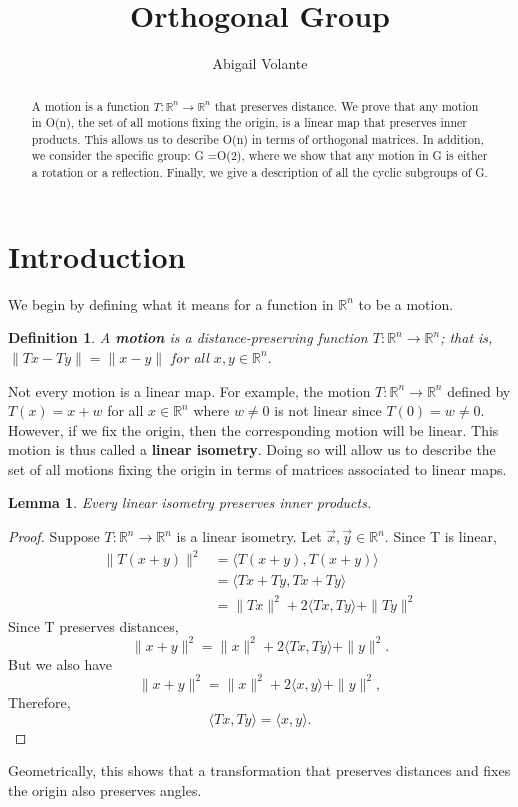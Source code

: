 \documentclass[a4 paper, 12pt]{article}
\newtheorem{lemma}[theorem]{Lemma}
\newtheorem{definition}[theorem]{Definition}
\begin{document}
	\author{Abigail Volante}
	\title{Orthogonal Group}
	\maketitle
	
	\begin{abstract}
		A motion is a function $T: \mathbb{R}^n \rightarrow \mathbb{R}^n$ that preserves distance. We prove that any motion in O(n), the set of all motions fixing the origin, is a linear map that preserves inner products. This allows us to describe O(n) in terms of orthogonal matrices.  In addition, we consider the specific group: G =O(2), where we show that any motion in G is either a rotation or a reflection. Finally, we give a description of all the cyclic subgroups of G. 
	\end{abstract}
	
	\section{Introduction}
	We begin by defining what it means for a function in $\mathbb{R}^n$ to be a motion. 
	
	\begin{definition}
		A \textbf{motion} is a distance-preserving function $T: \mathbb{R}^n \rightarrow \mathbb{R}^n$; that is, $\| Tx -Ty\| = \|x-y\|$ for all $x,y\in \mathbb{R}^n.$
	\end{definition}
	
	Not every motion is a linear map. For example, the motion $T: \mathbb{R}^n \rightarrow \mathbb{R}^n$ defined by $T(x) = x + w$ for all $x\in \mathbb{R}^n$ where $w \not = 0$ is not linear since $T(0) = w \not = 0.$ \cite{rotman} However, if we fix the origin, then the corresponding motion will be linear. This motion is thus called a \textbf{linear isometry}. Doing so will allow us to describe the set of all motions fixing the origin in terms of matrices associated to linear maps. \cite{baker}


		\begin{lemma}
		Every linear isometry preserves inner products. 
	\end{lemma}
	\begin{proof}
		Suppose $T: \mathbb{R}^n \rightarrow \mathbb{R}^n$ is a linear isometry. Let $\vec{x}, \vec{y} \in \mathbb{R}^n.$ Since T is linear,
		\begin{align*}
			\|T(x+ y)\|^2 
			&= \langle T(x+y), T(x+y) \rangle\\
			& = \langle Tx +Ty, Tx + Ty \rangle \\
			&= \| Tx \|^2 + 2\langle Tx, Ty \rangle + \|Ty\|^2
		\end{align*}
		Since T preserves distances,
		$$\|x+y\|^2 = \|x\|^2 + 2\langle Tx, Ty \rangle + \|y\|^2.$$
		But we also have
		$$\|x+y\|^2 = \|x\|^2 + 2 \langle x, y \rangle + \|y\|^2,$$
		Therefore,
		$$\langle Tx, Ty \rangle = \langle x, y \rangle.$$
	\end{proof}
	Geometrically, this shows that a transformation that preserves distances and fixes the origin also preserves angles.
	
\end{document}

